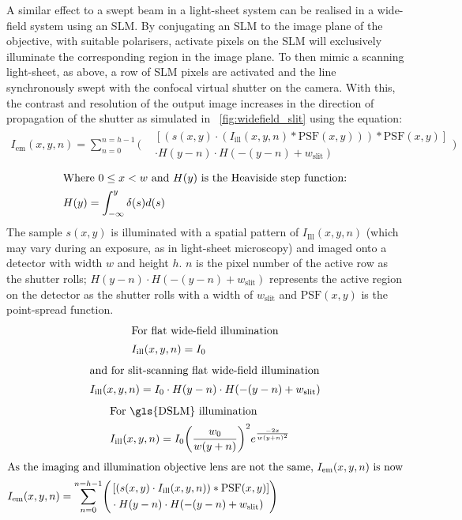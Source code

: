 A similar effect to a swept beam in a \gls{light-sheet} system can be realised in a \gls{wide-field} system using an \gls{SLM}.
By conjugating an \gls{SLM} to the image plane of the objective, with suitable polarisers, activate pixels on the \gls{SLM} will exclusively illuminate the corresponding region in the image plane.
To then mimic a scanning \gls{light-sheet}, as above, a row of \gls{SLM} pixels are activated and the line synchronously swept with the confocal virtual shutter on the camera.
With this, the contrast and resolution of the output image increases in the direction of propagation of the shutter as simulated in \figurename~\ref{fig:widefield_slit} using the equation:
\begin{align}
    I_{\text{em}}(x,y,n) = \sum_{n=0}^{n=h-1}
    \Biggl(\begin{split}
                &\left[ (s(x,y) \cdot (I_{\text{ill}}(x,y,n) * \text{PSF}(x,y))) * \text{PSF}(x,y) \right] \\ &\cdot  H(y-n) \cdot H(-(y-n)+w_{\text{slit}})
    \end{split}\Biggr)
\end{align}
\begin{align}
    \intertext{Where \(0\leq x < w \) and \(H(y)\) is the Heaviside step function:}
     H(y) = \int_{-\infty}^y \delta(s) d(s)
\end{align}
The sample \(s(x,y)\) is illuminated with a spatial pattern of \(I_{\text{Ill}}(x,y,n)\) (which may vary during an exposure, as in \gls{light-sheet} microscopy) and imaged onto a detector with width \(w\) and height \(h\).
\(n\) is the pixel number of the active row as the shutter rolls; \(H(y-n) \cdot H(-(y-n)+w_{\text{slit}})\) represents the active region on the detector as the shutter rolls with a width of \(w_{\text{slit}}\) and \(\text{PSF}(x,y)\) is the point-spread function.
\begin{align}
    \intertext{For flat wide-field illumination}
    I_{\text{ill}}(x,y,n) = {I_0}
\end{align}
\begin{align}
    \intertext{and for slit-scanning flat wide-field illumination}
    I_{\text{ill}}(x,y,n) = {I_0} \cdot  H(y-n) \cdot H(-(y-n)+w_{\text{slit}})
\end{align}
\begin{align}
    \intertext{For \gls{DSLM} illumination}
    I_{\text{ill}}(x,y,n) &= {I_0} {\left(\frac{w_0}{w{(y+n)}}\right)}^2 {e^{\frac{-2x}{w{(y+n)}^2}}}
\end{align}
\begin{align}
  \intertext{As the imaging and illumination objective lens are not the same, \(I_{\text{em}}(x,y,n)\) is now}
    I_{\text{em}}(x,y,n) = \sum_{n=0}^{n=h-1}
    \Biggl(\begin{split}
                &\left[ (s(x,y) \cdot I_{\text{ill}}(x,y,n)) * \text{PSF}(x,y) \right] \\ &\cdot  H(y-n) \cdot H(-(y-n)+w_{\text{slit}})
    \end{split}\Biggr)
\end{align}
